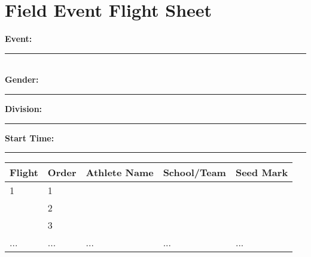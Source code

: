 \documentclass[11pt]{article}
\begin{document}
\vspace{2em}

\section*{Field Event Flight Sheet}

\textbf{Event:} \rule{10cm}{0.4pt} \\
\textbf{Gender:} \rule{3cm}{0.4pt} \hspace{1cm} \textbf{Division:} \rule{3cm}{0.4pt} \hspace{1cm} \textbf{Start Time:} \rule{3cm}{0.4pt}

\vspace{1em}

\begin{tabular}{@{}lllll@{}}
\toprule
\textbf{Flight} & \textbf{Order} & \textbf{Athlete Name} & \textbf{School/Team} & \textbf{Seed Mark} \\
\midrule
1 & 1 & & & \\
  & 2 & & & \\
  & 3 & & & \\
... & ... & ... & ... & ... \\
\bottomrule
\end{tabular}
\end{document}
